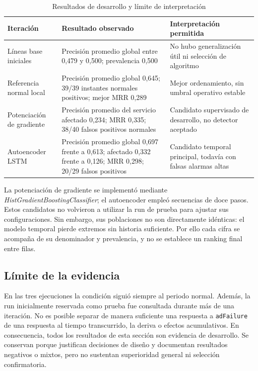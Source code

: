 \documentclass[conference]{IEEEtran}
\begin{document}
\begin{table}[t]
\caption{Resultados de desarrollo y límite de interpretación}
\label{tab:desarrollo}
\centering
\footnotesize
\renewcommand{\arraystretch}{1.15}
\begin{tabular}{p{}p{}p{}}
\toprule
\textbf{Iteración} & \textbf{Resultado observado} & \textbf{Interpretación permitida} \\
\midrule
Líneas base iniciales & Precisión promedio global entre 0,479 y 0,500; prevalencia 0,500 & No hubo generalización útil ni selección de algoritmo \\
Referencia normal local & Precisión promedio global 0,645; 39/39 instantes normales positivos; mejor MRR 0,289 & Mejor ordenamiento, sin umbral operativo estable \\
Potenciación de gradiente & Precisión promedio del servicio afectado 0,234; MRR 0,335; 38/40 falsos positivos normales & Candidato supervisado de desarrollo, no detector aceptado \\
Autoencoder LSTM & Precisión promedio global 0,697 frente a 0,613; afectado 0,332 frente a 0,126; MRR 0,298; 20/29 falsos positivos & Candidato temporal principal, todavía con falsas alarmas altas \\
\bottomrule
\end{tabular}
\end{table}

La potenciación de gradiente se implementó mediante \textit{HistGradientBoostingClassifier}; el autoencoder empleó secuencias de doce pasos. Estos candidatos no volvieron a utilizar la run de prueba para ajustar sus configuraciones. Sin embargo, sus poblaciones no son directamente idénticas: el modelo temporal pierde extremos sin historia suficiente. Por ello cada cifra se acompaña de su denominador y prevalencia, y no se establece un ranking final entre filas.

\subsection{Límite de la evidencia}

En las tres ejecuciones la condición siguió siempre al periodo normal. Además, la run inicialmente reservada como prueba fue consultada durante más de una iteración. No es posible separar de manera suficiente una respuesta a \texttt{adFailure} de una respuesta al tiempo transcurrido, la deriva o efectos acumulativos. En consecuencia, todos los resultados de esta sección son evidencia de desarrollo. Se conservan porque justifican decisiones de diseño y documentan resultados negativos o mixtos, pero no sustentan superioridad general ni selección confirmatoria.
\end{document}
